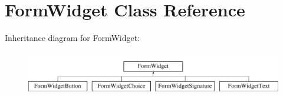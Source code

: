 \hypertarget{class_form_widget}{}\section{Form\+Widget Class Reference}
\label{class_form_widget}
Inheritance diagram for Form\+Widget\+:\begin{figure}[H]
\begin{center}
\leavevmode
\includegraphics[height=1.985816cm]{class_form_widget}
\end{center}
\end{figure}
